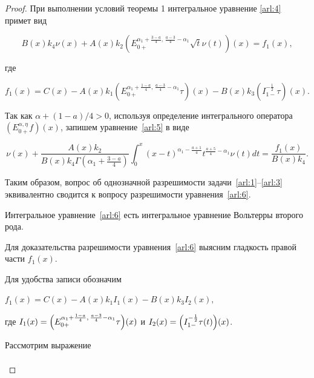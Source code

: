 \begin{proof} При выполнении условий теоремы 1 интегральное уравнение \eqref{arl:4} примет вид

\begin{equation}

B(x)k_4\nu(x)+A(x)k_2\left(E^{\alpha_1+\frac{3-a}{4},\,\frac{a-3}{4}-\alpha_1}_{0+}\sqrt{t}\nu(t)\right)(x)=f_1(x),

\label{arl:5}

\end{equation}

где

$$

f_1(x)=C(x)-A(x)k_1\left(E^{\alpha_1+\frac{1-a}{4},\,\frac{a-3}{4}-\alpha_1}_{0+}\tau\right)(x)-B(x)k_3\left(I^{-\frac 12}_{1-}\tau\right)(x).

$$

Так как $\alpha+({1-a})/{4}>0$, используя определение интегрального оператора $\left(E^{\alpha, \eta}_{0+}f\right)(x)$, запишем уравнение~\eqref{arl:5} в виде

\begin{equation}

\nu(x)+\frac{A(x)k_2}{B(x)k_4\Gamma\left(\alpha_1+\frac{3-a}{4}\right)}\int_{0}^{x}(x-t)^{\alpha_1-\frac{a+1}{4}}t^{\frac{a+5}{4}-\alpha_1}\nu(t)dt=\frac{f_1(x)}{B(x)k_4}.

\label{arl:6}

\end{equation}

Таким образом, вопрос об однозначной разрешимости задачи~\eqref{arl:1}--\eqref{arl:3} эквивалентно сводится к вопросу разрешимости уравнения~\eqref{arl:6}.



Интегральное уравнение~\eqref{arl:6} есть интегральное уравнение Вольтерры второго рода.

Для доказательства разрешимости уравнения~\eqref{arl:6} выясним гладкость правой части $f_1(x)$.



Для удобства записи обозначим

$f_1(x)=C(x)-A(x)k_1I_1(x)-B(x)k_3I_2(x),$

где $I_1(x)=\Bigl(E^{\alpha_1+\frac{1-a}{4},\,\frac{a-3}{4}-\alpha_1}_{0+}\tau\Bigr)(x)$ и $I_2(x)=\Bigl(I^{-\frac 12}_{1-}\tau(t)\Bigr)(x)$.

Рассмотрим выражение

\begin{multline*}


\end{multline*}
\end{proof}
